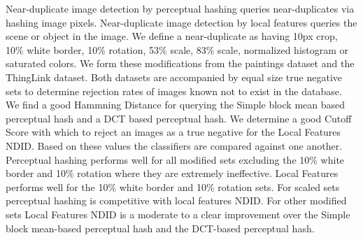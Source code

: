\documentclass[english,12pt,a4paper,pdftex,elec,utf8, table]{aaltothesis}
\begin{document}


\makecoverpage




\begin{abstractpage}[english]
  Near-duplicate image detection by perceptual hashing queries near-duplicates via hashing image pixels. Near-duplicate image detection by local features queries the scene or object in the image. We define a near-duplicate as having 10px crop, 10\% white border, 10\% rotation, 53\% scale, 83\% scale, normalized histogram or saturated colors. We form these modifications from the paintings dataset and the ThingLink dataset. Both datasets are accompanied by equal size true negative sets to determine rejection rates of images known not to exist in the database. We find a good Hammning Distance for querying the Simple block mean based perceptual hash and a DCT based perceptual hash. We determine a good Cutoff Score with which to reject an images as a true negative for the Local Features NDID. Based on these values the classifiers are compared against one another. Perceptual hashing performs well for all modified sets excluding the 10\% white border and 10\% rotation where they are extremely ineffective. Local Features performs well for the 10\% white border and 10\% rotation sets. For scaled sets perceptual hashing is competitive with local features NDID. For other modified sets Local Features NDID is a moderate to a clear improvement over the Simple block mean-based perceptual hash and the DCT-based perceptual hash.
\end{abstractpage}
\end{document}
